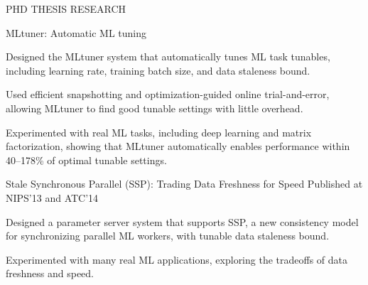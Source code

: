 \documentclass{resume} %
\begin{document}
\begin{rSection}{PHD THESIS RESEARCH}
\begin{rSubsection}{\hspace{-1em} MLtuner: Automatic ML tuning}{}
{}{}
\vspace{-0.3em}
\item Designed the MLtuner system that automatically tunes ML task tunables, including learning rate, training batch size, and data staleness bound.
\item Used efficient snapshotting and optimization-guided online trial-and-error, allowing MLtuner to find good tunable settings with little overhead.
\item Experimented with real ML tasks, including deep learning and matrix factorization, showing that MLtuner automatically enables performance within 40--178\% of optimal tunable settings.
\end{rSubsection}
\vspace{-.1in}


\begin{rSubsection}{\hspace{-1em} Stale Synchronous Parallel (SSP): Trading Data Freshness for Speed}{}
{Published at NIPS'13 and ATC'14}{}
\vspace{-0.3em}
\item Designed a parameter server system that supports SSP, a new consistency model for synchronizing parallel ML workers, with tunable data staleness bound.
\item Experimented with many real ML applications, exploring the tradeoffs of data freshness and speed.
\end{rSubsection}
\vspace{-.1in}

\end{rSection}
\vspace{-.05in}
\end{document}
